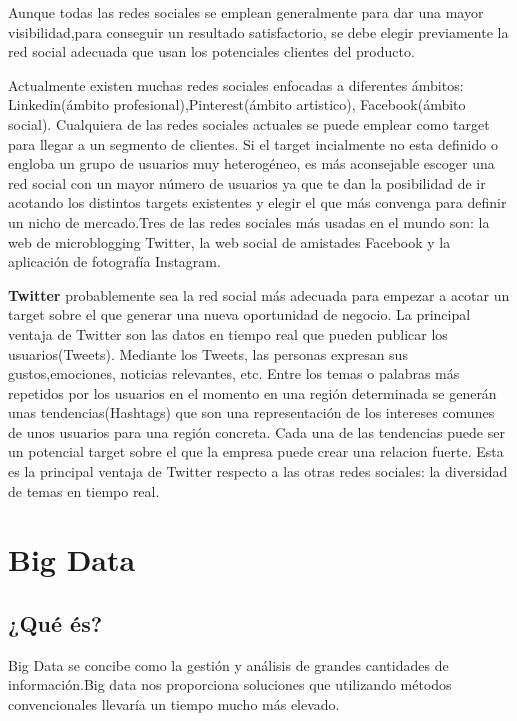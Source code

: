 Aunque todas las redes sociales se emplean generalmente para dar una mayor visibilidad,para conseguir un resultado satisfactorio, se debe elegir previamente la red social adecuada que usan los potenciales clientes del producto. 

\vspace{5 mm}

Actualmente existen muchas redes sociales enfocadas a diferentes ámbitos: Linkedin(ámbito profesional),Pinterest(ámbito artistico), Facebook(ámbito social). Cualquiera de las redes sociales actuales se puede emplear como target para llegar a un segmento de clientes. Si el target incialmente no esta definido o engloba un grupo de usuarios muy heterogéneo, es más aconsejable escoger una red social con  un mayor número de usuarios ya que te dan la posibilidad de ir acotando los distintos targets existentes y elegir el que más convenga para definir un nicho de mercado.Tres de las redes sociales más usadas en el mundo son: la web de microblogging Twitter, la web social de amistades Facebook y la aplicación de fotografía Instagram.

\vspace{5 mm}

\textbf{Twitter} probablemente sea la red social más adecuada para empezar a acotar un target sobre el que generar una nueva oportunidad de negocio. La principal ventaja de Twitter son las datos en tiempo real que pueden publicar los usuarios(Tweets). Mediante los Tweets, las personas expresan sus gustos,emociones, noticias relevantes, etc. Entre los temas o palabras más repetidos por los usuarios en el momento en una región determinada se generán unas tendencias(Hashtags) que son una representación de los intereses comunes de unos usuarios para una región concreta. Cada una de las tendencias puede ser un potencial target sobre el que la empresa puede crear una relacion fuerte. Esta es la principal ventaja de Twitter respecto a las otras redes sociales: la diversidad de temas en tiempo real.

\section{Big Data}

\subsection{¿Qué és?}

Big Data se concibe como la gestión y análisis de grandes cantidades de información.Big data nos proporciona soluciones que utilizando métodos convencionales llevaría un tiempo mucho más elevado.

